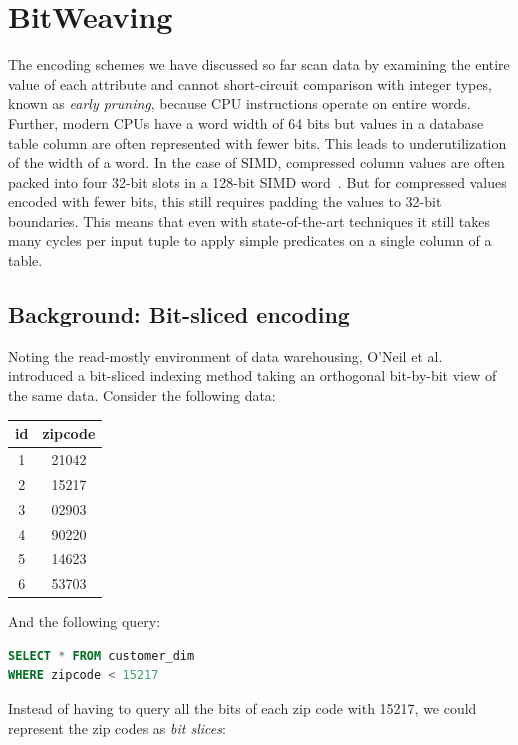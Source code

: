 \documentclass[11pt]{article}
\begin{document}
\section{BitWeaving}
The encoding schemes we have discussed so far scan data by examining the entire value of each attribute and cannot short-circuit comparison with integer types, known as \textit{early pruning}, because CPU instructions operate on entire words. Further, modern CPUs have a word width of 64 bits but values in a database table column are often represented with fewer bits. This leads to underutilization of the width of a word. In the case of SIMD, compressed column values are often packed into four 32-bit slots in a 128-bit SIMD word~\cite{simdfastscan}. But for compressed values encoded with fewer bits, this still requires padding the values to 32-bit boundaries. This means that even with state-of-the-art techniques it still takes many cycles per input tuple to apply simple predicates on a single column of a table.

\subsection{Background: Bit-sliced encoding}
Noting the read-mostly environment of data warehousing, O'Neil et al.~\cite{varindexes} introduced a bit-sliced indexing method taking an orthogonal bit-by-bit view of the same data. Consider the following data:

\begin{table}[!htbp]
\begin{tabular}{|c|c|}
\hline
\rowcolor{headerColor2}
id & zipcode \\
\hline
1 & 21042 \\
2 & 15217 \\
3 & 02903 \\
4 & 90220 \\
5 & 14623 \\
6 & 53703 \\
\hline
\end{tabular}
\end{table}
And the following query:
\begin{lstlisting}[language=SQL]
SELECT * FROM customer_dim
WHERE zipcode < 15217
\end{lstlisting}

Instead of having to query all the bits of each zip code with 15217, we could represent the zip codes as \textit{bit slices}:
\end{document}
